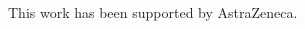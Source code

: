\documentclass[smallextended]{svjour3}       %
\begin{document}
\begin{CJK}{UTF8}{gbsn}
\begin{acknowledgements}
This work has been supported by AstraZeneca.
\end{acknowledgements}

%


\appendix

\end{CJK}
\end{document}
